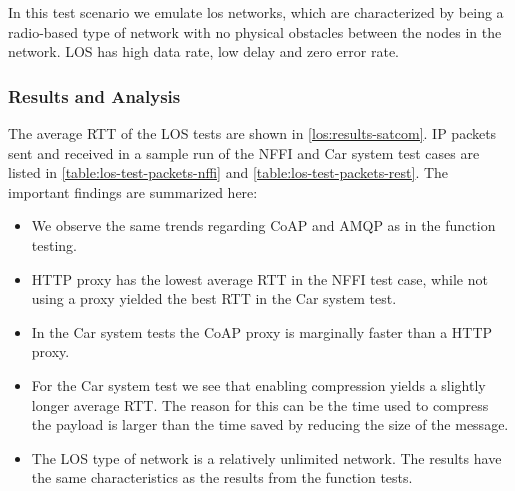 In this test scenario we emulate \gls{los} networks, which are characterized by
being a radio-based type of network with no physical obstacles between the nodes
in the network. LOS has high data rate, low delay and zero error rate.

\subsubsection{Results and Analysis}

The average RTT of the LOS tests are shown in \cref{los:results-satcom}. IP
packets sent and received in a sample run of the NFFI and Car system test cases
are listed in \cref{table:los-test-packets-nffi} and
\cref{table:los-test-packets-rest}. The important findings are summarized here:

\begin{itemize}

    \item We observe the same trends regarding CoAP and AMQP as in the function
    testing.

    \item HTTP proxy has the lowest average RTT in the NFFI test case, while not
    using a proxy yielded the best RTT in the Car system test.

    \item In the Car system tests the CoAP proxy is marginally faster than a
    HTTP proxy.

    \item For the Car system test we see that enabling compression yields a
    slightly longer average RTT. The reason for this can be the time used to
    compress the payload is larger than the time saved by reducing the size of
    the message.

    \item The LOS type of network is a relatively unlimited network. The results
    have the same characteristics as the results from the function tests.

\end{itemize}



